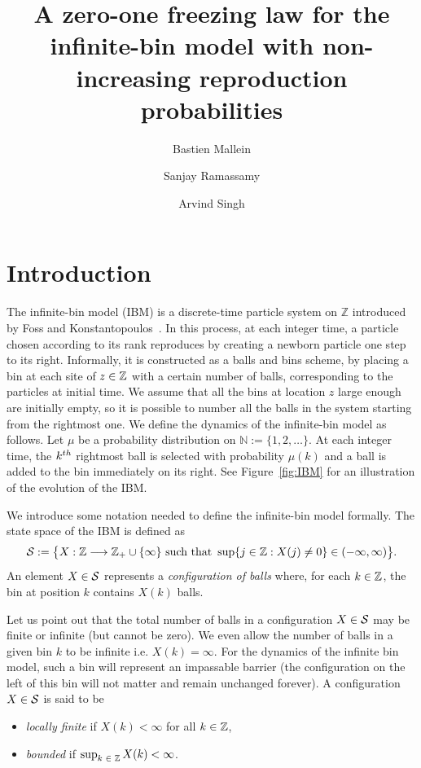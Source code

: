 \documentclass[10pt]{amsart}
\theoremstyle{definition}\newtheorem{defi}[theo]{Definition}\newtheorem{rema}[theo]{Remark}\newtheorem{exam}[theo]{Example}\newtheorem{exem}[theo]{Example}\newtheorem{nota}[theo]{Notation}
\newcommand{\bbN}{\mathbb{N}}
\newcommand{\Z}{\mathbb{Z}}
\renewcommand{\S}{\mathcal{S}}
\let\oldin\in
\renewcommand{\in}{\mathchoice{\oldin}{\oldin}{\,\oldin\,}{\,\oldin\,}}
\renewcommand*{\to}{\mathchoice{\longrightarrow}{\rightarrow}{\rightarrow}{\rightarrow}}
\begin{document}
\title{A zero-one freezing law for the infinite-bin model with non-increasing reproduction probabilities}
\author{Bastien Mallein \and Sanjay Ramassamy \and Arvind Singh}
\maketitle
\section{Introduction}\label{sec:introduction}

The infinite-bin model (IBM) is a discrete-time particle system on $\Z$ introduced by Foss and Konstantopoulos~\cite{FK}. In this process, at each integer time, a particle chosen according to its rank reproduces by creating a newborn particle one step to its right. Informally, it is constructed as a balls and bins scheme, by placing a bin at each site of $z\in\Z$ with a certain number of balls, corresponding to the particles at initial time. We assume that all the bins at location $z$ large enough are initially empty, so it is possible to number all the balls in the system starting from the rightmost one. We define the dynamics of the infinite-bin model as follows. Let $\mu$ be a probability distribution on $\bbN
:= \{1,2,\ldots\}$. At each integer time, the $k^{\rm th}$ rightmost ball is selected with probability $\mu(k)$ and a ball is added to the bin immediately on its right. See Figure~\ref{fig:IBM} for an illustration of the evolution of the IBM.

We introduce some notation needed to define the infinite-bin model formally. The state space of the IBM is defined as
\[
\S
:= \bigl\{ X : \Z \to \Z_+\cup \{\infty\} \text{ such that } \sup\{ j \in \Z : X(j) \neq 0 \} \in (-\infty,\infty) \bigr\}.
\]
An element $X\in \S$ represents a \emph{configuration of balls} where, for each $k \in \Z$, the bin at position $k$ contains $X(k)$ balls.

Let us point out that the total number of balls in a configuration $X \in \S$ may be finite or infinite (but cannot be zero). We even allow the number of balls in a given bin $k$ to be infinite i.e. $ X(k) = \infty$. For the dynamics of the infinite bin model, such a bin will represent an impassable barrier (the configuration on the left of this bin will not matter and remain unchanged forever). A configuration $X \in \S$ is said to be
\begin{itemize}
\item \emph{locally finite} if $X(k) < \infty$ for all $k\in \Z$,
\item \emph{bounded} if $\sup_{k\in \Z} X(k) < \infty$.
\end{itemize}
\end{document}
